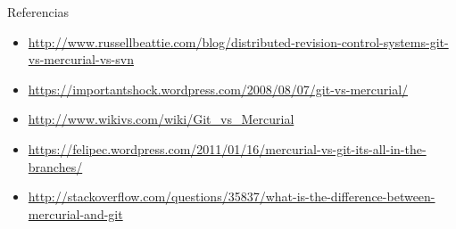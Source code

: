 \documentclass[spanish]{beamer}
\begin{document}
    \begin{frame}{Referencias}
     \begin{itemize}
	    \item \url{http://www.russellbeattie.com/blog/distributed-revision-control-systems-git-vs-mercurial-vs-svn}
	    \item \url{https://importantshock.wordpress.com/2008/08/07/git-vs-mercurial/}
	    \item \url{http://www.wikivs.com/wiki/Git_vs_Mercurial}
	    \item \url{https://felipec.wordpress.com/2011/01/16/mercurial-vs-git-its-all-in-the-branches/}
        \item \url{http://stackoverflow.com/questions/35837/what-is-the-difference-between-mercurial-and-git}
\end{itemize}
        \end{frame}


 
\end{document}
